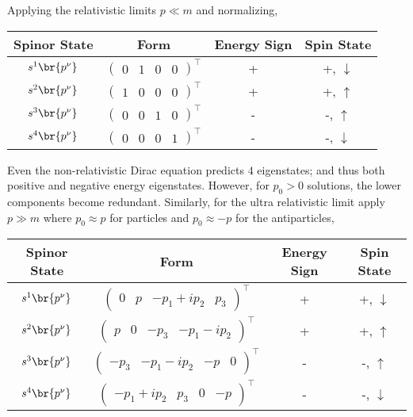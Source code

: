 \documentclass{article}
\begin{document}
Applying the relativistic limits $p \ll m$ and normalizing,
\begin{center}
\begin{tabular}{|c|c|c|c|}
    \hline
    Spinor State & Form & Energy Sign & Spin State \\
    \hline
    $s^{1}\br{p^{\nu}}$ & $\begin{pmatrix} 0 & 1 & 0 & 0 \end{pmatrix}^{\intercal}$ & + & +, $\downarrow$\\
    $s^{2}\br{p^{\nu}}$ & $\begin{pmatrix} 1 & 0 & 0 & 0 \end{pmatrix}^{\intercal}$ & + & +, $\uparrow$\\
    $s^{3}\br{p^{\nu}}$ & $\begin{pmatrix} 0 & 0 & 1 & 0 \end{pmatrix}^{\intercal}$ & - & -, $\uparrow$\\
    $s^{4}\br{p^{\nu}}$ & $\begin{pmatrix} 0 & 0 & 0 & 1 \end{pmatrix}^{\intercal}$ & - & -, $\downarrow$\\
    \hline
\end{tabular}
\end{center}
Even the non-relativistic Dirac equation predicts $4$ eigenstates; and thus both positive and negative energy eigenstates. However, for $p_0 > 0$ solutions, the lower components become redundant.
Similarly, for the ultra relativistic limit apply $p \gg m$ where $p_0 \approx p$ for particles and $p_0 \approx - p$ for the antiparticles,
\begin{center}
\begin{tabular}{|c|c|c|c|}
    \hline
    Spinor State & Form & Energy Sign & Spin State \\
    \hline
    $s^{1}\br{p^{\nu}}$ & $\begin{pmatrix} 0 & {p } & {-p_1 + i p_2} & {p_3} \end{pmatrix}^{\intercal}$ & + & +, $\downarrow$\\
    $s^{2}\br{p^{\nu}}$ & $\begin{pmatrix} {p } & 0 & {-p_3} & {-p_1 - i p_2} \end{pmatrix}^{\intercal}$ & + & +, $\uparrow$\\
    $s^{3}\br{p^{\nu}}$ & $\begin{pmatrix} {-p_3} & {-p_1 - i p_2} & {-p } & 0 \end{pmatrix}^{\intercal}$ & - & -, $\uparrow$\\
    $s^{4}\br{p^{\nu}}$ & $\begin{pmatrix} {-p_1 + i p_2} & {p_3} & 0 & {-p} \end{pmatrix}^{\intercal}$ & - & -, $\downarrow$\\
    \hline
\end{tabular}
\end{center}
\end{document}
